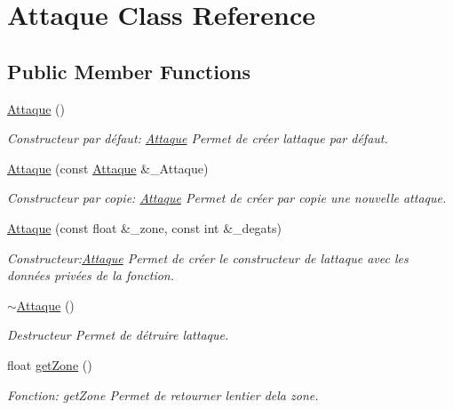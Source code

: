 \hypertarget{classAttaque}{}\section{Attaque Class Reference}
\label{classAttaque}
\subsection*{Public Member Functions}
\begin{DoxyCompactItemize}
\item 
\hyperlink{classAttaque_a1683db1342d1d26f9fc2162ef1975b23}{Attaque} ()
\begin{DoxyCompactList}\small\item\em Constructeur par défaut\+: \hyperlink{classAttaque}{Attaque} Permet de créer l\textquotesingle{}attaque par défaut. \end{DoxyCompactList}\item 
\hyperlink{classAttaque_a1a6b78c3649a5860530da68f9c6bbfbf}{Attaque} (const \hyperlink{classAttaque}{Attaque} \&\+\_\+\+Attaque)
\begin{DoxyCompactList}\small\item\em Constructeur par copie\+: \hyperlink{classAttaque}{Attaque} Permet de créer par copie une nouvelle attaque. \end{DoxyCompactList}\item 
\hyperlink{classAttaque_a103553de7b33d7f8682f9beaa51d878a}{Attaque} (const float \&\+\_\+zone, const int \&\+\_\+degats)
\begin{DoxyCompactList}\small\item\em Constructeur\+:\hyperlink{classAttaque}{Attaque} Permet de créer le constructeur de l\textquotesingle{}attaque avec les données privées de la fonction. \end{DoxyCompactList}\item 
\mbox{\label{classAttaque_a1053986fc93c91f74ea60c898e6fc289}} 
\hyperlink{classAttaque_a1053986fc93c91f74ea60c898e6fc289}{$\sim$\+Attaque} ()
\begin{DoxyCompactList}\small\item\em Destructeur Permet de détruire l\textquotesingle{}attaque. \end{DoxyCompactList}\item 
float \hyperlink{classAttaque_a84b1813598ac33dfcb76652d7ad4ebd4}{get\+Zone} ()
\begin{DoxyCompactList}\small\item\em Fonction\+: get\+Zone Permet de retourner l\textquotesingle{}entier dela zone. \end{DoxyCompactList}\item 

\end{DoxyCompactItemize}
